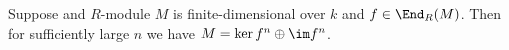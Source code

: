 Suppose and $R$-module $M$ is finite-dimensional over
$k$ and $f \in \End_R(M)$. Then for sufficiently large $n$ we have
$M = \ker f^n\oplus \im f^n$.

